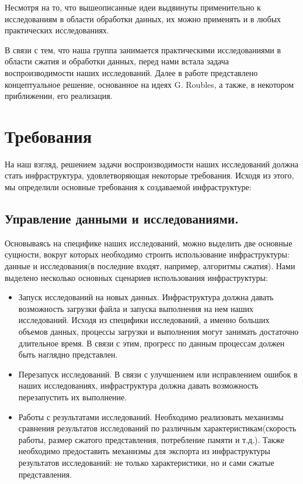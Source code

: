 \documentclass[12pt,a4paper]{extarticle}
\begin{document}
Несмотря на то, что вышеописанные идеи выдвинуты применительно к исследованиям в области обработки данных, их можно применять и в любых практических исследованиях. 


В связи с тем, что наша группа занимается практическими исследованиями в области сжатия и обработки данных, перед нами встала задача воспроизводимости наших исследований. Далее в работе представлено концептуальное решение, основанное на идеях G. Roubles, а также, в некотором приближении, его реализация.

\newpage

\section{Требования}
На наш взгляд, решением задачи воспроизводимости наших исследований должна стать инфраструктура, удовлетворяющая некоторые требования.
Исходя из этого, мы определили основные требования к создаваемой инфраструктуре:

\subsection{Управление данными и исследованиями.}
Основываясь на специфике наших исследований, можно выделить две основные сущности, вокруг которых необходимо строить использование инфраструктуры: данные и исследования(в последние входят, например, алгоритмы сжатия). Нами выделено несколько основных сценариев использования инфраструктуры:
\begin{itemize}
	\item{Запуск исследований на новых данных.} Инфраструктура должна давать возможность загрузки файла и запуска выполнения на нем наших исследований. Исходя из специфики исследований, а именно больших объемов данных, процессы загрузки и выполнения могут занимать достаточно длительное время. В связи с этим, прогресс по данным процессам должен быть наглядно представлен. 
	\item{Перезапуск исследований.} В связи с улучшением или исправлением ошибок в наших исследованиях, инфраструктура должна давать возможность перезапустить их выполнение.
	\item{Работы с результатами исследований.} Необходимо реализовать механизмы сравнения результатов исследований по различным характеристикам(скорость работы, размер сжатого представления, потребление памяти и т.д.). Также необходимо предоставить механизмы для экспорта из инфраструктуры результатов исследований: не только характеристики, но и сами сжатые представления. 
\end{itemize}
\end{document}
